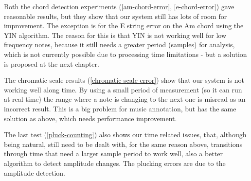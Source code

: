 Both the chord detection experiments (\autoref{am-chord-error}, \autoref{e-chord-error}) gave reasonable results, but they
show that our system still has lots of room for improvement. The exception is for
the E string error on the Am chord using the YIN algorithm. The reason
for this is that YIN is not working well for low frequency notes, because
it still needs a greater period (samples) for analysis, which is not currently
possible due to processing time limitations - but a solution is proposed at
the next chapter.

The chromatic scale results (\autoref{chromatic-scale-error}) show that our system is not working well along time.
By using a small period of measurement (so it can run at real-time) the range
where a note is changing to the next one is misread as an incorrect result.
This is a big problem for music annotation, but has the same solution as above,
which needs performance improvement.

The last test (\autoref{pluck-counting}) also shows our time related issues,
that, although being natural, still need to be dealt with, for the same reason above, transitions
through time that need a larger sample period to work well, also a better algorithm to detect
amplitude changes. The plucking errors are due to the amplitude detection.
